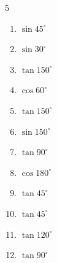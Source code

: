 \begin{multicols}{5}
\begin{enumerate}

  \item $\displaystyle \sin{45^\circ}$


  \item $\displaystyle \sin{30^\circ}$


  \item $\displaystyle \tan{150^\circ}$


  \item $\displaystyle \cos{60^\circ}$


  \item $\displaystyle \tan{150^\circ}$


  \item $\displaystyle \sin{150^\circ}$


  \item $\displaystyle \tan{90^\circ}$

        \phantom{$\displaystyle なし$}

\columnbreak %

  \item $\displaystyle \cos{180^\circ}$

        \phantom{$\displaystyle =-1$}

  \item $\displaystyle \tan{45^\circ}$

        \phantom{$\displaystyle =1$}

  \item $\displaystyle \tan{45^\circ}$

        \phantom{$\displaystyle =1$}

  \item $\displaystyle \tan{120^\circ}$


  \item $\displaystyle \tan{90^\circ}$

        \phantom{$\displaystyle なし$}


\end{enumerate}
\end{multicols}
